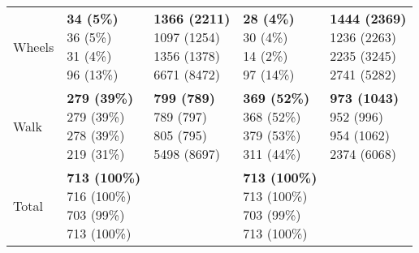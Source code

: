 \begin{table}
\begin{center}
\begin{small}
\begin{tabular}{lllll}
Wheels      &  \makecell[l]{\textbf{34 (5\%)} \\36 (5\%) \\31 (4\%) \\96 (13\%) \\}      &  \makecell[l]{\textbf{1366 (2211)} \\1097 (1254) \\1356 (1378) \\6671 (8472) \\}      &  \makecell[l]{\textbf{28 (4\%)} \\30 (4\%) \\14 (2\%) \\97 (14\%) \\}      &  \makecell[l]{\textbf{1444 (2369)} \\1236 (2263) \\2235 (3245) \\2741 (5282) \\} \\ \cline{2-5}
Walk      &  \makecell[l]{\textbf{279 (39\%)} \\279 (39\%) \\278 (39\%) \\219 (31\%) \\}      &  \makecell[l]{\textbf{799 (789)} \\789 (797) \\805 (795) \\5498 (8697) \\}      &  \makecell[l]{\textbf{369 (52\%)} \\368 (52\%) \\379 (53\%) \\311 (44\%) \\}      &  \makecell[l]{\textbf{973 (1043)} \\952 (996) \\954 (1062) \\2374 (6068) \\} \\ \cline{2-5}
      Total       & \makecell[l]{\textbf{713 (100\%)} \\716 (100\%) \\703 (99\%) \\713 (100\%) \\} &       & \makecell[l]{\textbf{713 (100\%)} \\713 (100\%) \\703 (99\%) \\713 (100\%) \\} & \\ 


\end{tabular}
\end{small}
\end{center}
\end{table}
